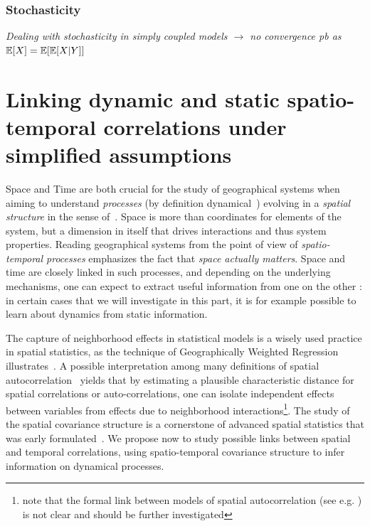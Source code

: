 \subsubsection{Stochasticity}

\textit{Dealing with stochasticity in simply coupled models $\rightarrow$ no convergence pb as $\operatorname{\mathbb{E}}\!\left[X\right]=\operatorname{\mathbb{E}}\!\left[\operatorname{\mathbb{E}}\!\left[X|Y\right]\right]$}














\newpage



\section[Spatio-temporal Correlations]{Linking dynamic and static spatio-temporal correlations under simplified assumptions}

\label{sec:spatiotempcorrs}

Space and Time are both crucial for the study of geographical systems when aiming to understand \emph{processes} (by definition dynamical~\cite{hypergeo}) evolving in a \emph{spatial structure} in the sense of~\cite{dollfus1975some}. Space is more than coordinates for elements of the system, but a dimension in itself that drives interactions and thus system properties. Reading geographical systems from the point of view of \emph{spatio-temporal processes} emphasizes the fact that \emph{space actually matters}. Space and time are closely linked in such processes, and depending on the underlying mechanisms, one can expect to extract useful information from one on the other : in certain cases that we will investigate in this part, it is for example possible to learn about dynamics from static information.


The capture of neighborhood effects in statistical models is a wisely used practice in spatial statistics, as the technique of Geographically Weighted Regression illustrates~\cite{brunsdon1998geographically}. A possible interpretation among many definitions of spatial autocorrelation~\cite{griffith1992spatial} yields that by estimating a plausible characteristic distance for spatial correlations or auto-correlations, one can isolate independent effects between variables from effects due to neighborhood interactions\footnote{note that the formal link between models of spatial autocorrelation (see e.g. \cite{griffith2012advanced}) is not clear and should be further investigated}. The study of the spatial covariance structure is a cornerstone of advanced spatial statistics that was early formulated~\cite{griffith1980towards}. We propose now to study possible links between spatial and temporal correlations, using spatio-temporal covariance structure to infer information on dynamical processes.


